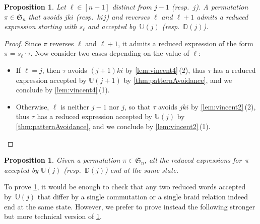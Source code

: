 \documentclass{amsart}
\newtheorem{proposition}[theorem]{Proposition}
\newcommand{\fS}{\mathfrak{S}} %
\newcommand{\automatonU}{\mathbb{U}} %
\newcommand{\automatonD}{\mathbb{D}} %
\begin{document}
\begin{proposition}\label{prop:algorithm}
Let $\ell \in [n-1]$ distinct from $j-1$ (resp.~$j$).
A permutation $\pi \in \fS_n$ that avoids $jki$ (resp.~$kij$) and reverses $\ell$ and $\ell+1$ admits a reduced expression starting with $s_\ell$ and accepted by~$\automatonU(j)$ (resp.~$\automatonD(j)$).
\end{proposition}

\begin{proof}
Since $\pi$ reverses $\ell$ and $\ell+1$, it admits a reduced expression of the form~$\pi = s_\ell \cdot \tau$. Now consider two cases depending on the value of $\ell$:
\begin{itemize}
	\item If $\ell = j$, then $\tau$ avoids $(j+1)ki$ by \cref{lem:vincent4}\,(2), thus $\tau$ has a reduced expression accepted by $\automatonU(j+1)$ by \cref{thm:patternAvoidance}, and we conclude by \cref{lem:vincent4}\,(1).
	\item Otherwise, $\ell$ is neither $j-1$ nor $j$, so that $\tau$ avoids $jki$ by \cref{lem:vincent2}\,(2), thus $\tau$ has a reduced expression accepted by $\automatonU(j)$ by \cref{thm:patternAvoidance}, and we conclude by \cref{lem:vincent2}\,(1).
	\qedhere
\end{itemize}
\end{proof}

\begin{proposition}\label{prop:sameStateAcceptedReducedExpressions}
Given a permutation $\pi \in \fS_n$, all the reduced expressions for~$\pi$ accepted by $\automatonU(j)$ (resp.~$\automatonD(j)$) end at the same state.
\end{proposition}

To prove \cref{prop:sameStateAcceptedReducedExpressions}, it would be enough to check that any two reduced words accepted by~$\automatonU(j)$ that differ by a single commutation or a single braid relation indeed end at the same state.
However, we prefer to prove instead the following stronger but more technical version of \cref{prop:sameStateAcceptedReducedExpressions}.
\end{document}
